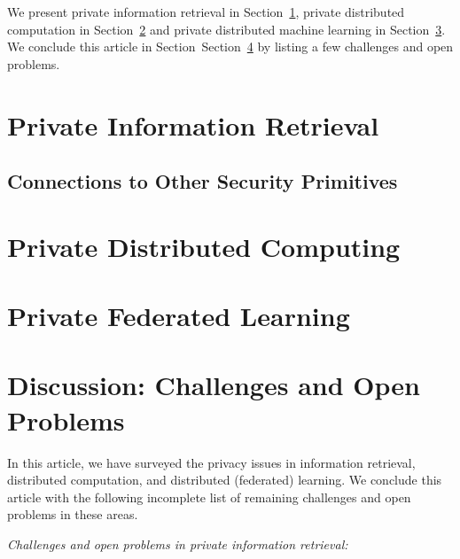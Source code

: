 \documentclass[12pt,draftcls,onecolumn]{IEEEtran}
\begin{document}
We present private information retrieval in Section~\ref{sect:pir}, private distributed computation in Section~\ref{sect:pdc} and private distributed machine learning in Section~\ref{sect:pml}. We conclude this article in Section~Section~\ref{sect:conc} by listing a few challenges and open problems.

\section{Private Information Retrieval} \label{sect:pir}


\subsection{Connections to Other Security Primitives}


\section{Private Distributed Computing} \label{sect:pdc}


\section{Private Federated Learning} \label{sect:pml}


\section{Discussion: Challenges and Open Problems} \label{sect:conc}

In this article, we have surveyed the privacy issues in information retrieval, distributed computation, and distributed (federated) learning. We conclude this article with the following incomplete list of remaining challenges and open problems in these areas.

\emph{Challenges and open problems in private information retrieval:}
\end{document}
